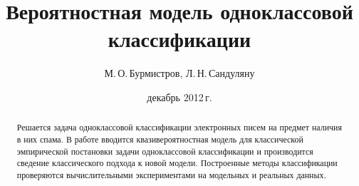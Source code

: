 \title{Вероятностная модель одноклассовой классификации}
\author{М.\,О.\,Бурмистров, Л.\,Н.\,Сандуляну}
\address{Московский физико-технический институт, ФУПМ, каф. <<Интеллектуальные системы>>}
\date{декабрь 2012\,г.}

\begin{abstract}
Решается задача одноклассовой классификации электронных писем на предмет наличия в них спама. 
В работе вводится квазивероятностная модель для классической эмпирической постановки задачи одноклассовой классификации и 
производится сведение классического подхода к новой модели.
Построенные методы классификации проверяются вычислительными экспериментами на модельных и реальных данных.
\end{abstract}
